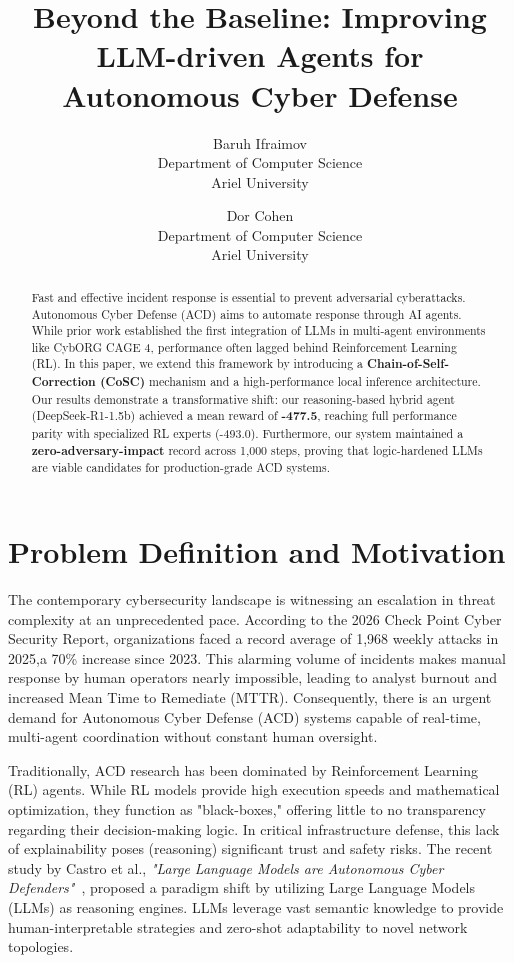 \documentclass[letterpaper, 10 pt, conference]{ieeeconf}
\title{\LARGE \bf Beyond the Baseline: Improving LLM-driven Agents for Autonomous Cyber Defense %
}
\author{
    Baruh Ifraimov \\
    Department of Computer Science \\
    Ariel University \\
    \and
    Dor Cohen \\
    Department of Computer Science \\
    Ariel University \\
}
\date{}
\begin{document}
\maketitle
\thispagestyle{empty}
\pagestyle{empty}



\begin{abstract}
Fast and effective incident response is essential to prevent adversarial cyberattacks. Autonomous Cyber Defense (ACD) aims to automate response through AI agents. While prior work established the first integration of LLMs in multi-agent environments like CybORG CAGE 4, performance often lagged behind Reinforcement Learning (RL). In this paper, we extend this framework by introducing a \textbf{Chain-of-Self-Correction (CoSC)} mechanism and a high-performance local inference architecture. Our results demonstrate a transformative shift: our reasoning-based hybrid agent (DeepSeek-R1-1.5b) achieved a mean reward of \textbf{-477.5}, reaching full performance parity with specialized RL experts (-493.0). Furthermore, our system maintained a \textbf{zero-adversary-impact} record across 1,000 steps, proving that logic-hardened LLMs are viable candidates for production-grade ACD systems.
\end{abstract}


\section{Problem Definition and Motivation}
The contemporary cybersecurity landscape is witnessing an escalation in threat complexity at an unprecedented pace. According to the 2026 Check Point Cyber Security Report, organizations faced a record average of 1,968 weekly attacks in 2025,a 70\% increase since 2023. This alarming volume of incidents makes manual response by human operators nearly impossible, leading to analyst burnout and increased Mean Time to Remediate (MTTR). Consequently, there is an urgent demand for Autonomous Cyber Defense (ACD) systems capable of real-time, multi-agent coordination without constant human oversight.

Traditionally, ACD research has been dominated by Reinforcement Learning (RL) agents. While RL models provide high execution speeds and mathematical optimization, they function as "black-boxes," offering little to no transparency regarding their decision-making logic. In critical infrastructure defense, this lack of explainability poses (reasoning) significant trust and safety risks. The recent study by Castro et al., \textit{"Large Language Models are Autonomous Cyber Defenders"}~\cite{arXiv:2505.04843v2}, proposed a paradigm shift by utilizing Large Language Models (LLMs) as reasoning engines. LLMs leverage vast semantic knowledge to provide human-interpretable strategies and zero-shot adaptability to novel network topologies.
\end{document}
